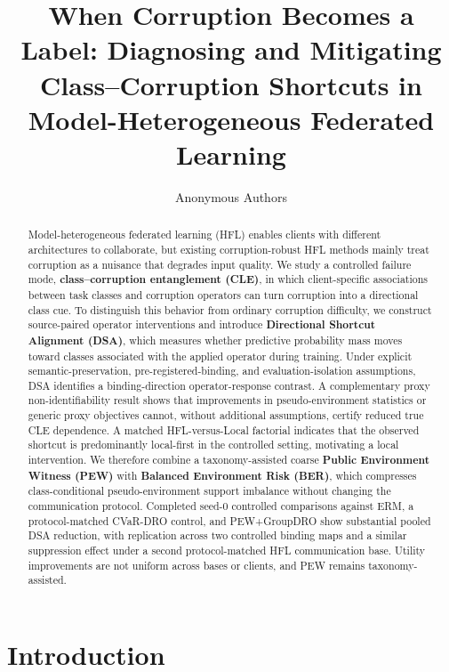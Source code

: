 \documentclass[10pt,twocolumn]{article}
\title{When Corruption Becomes a Label: Diagnosing and Mitigating\\
Class--Corruption Shortcuts in Model-Heterogeneous Federated Learning}
\author{Anonymous Authors}
\date{}
\begin{document}
\maketitle

\begin{abstract}

Model-heterogeneous federated learning (HFL) enables clients with different architectures to collaborate, but existing corruption-robust HFL methods mainly treat corruption as a nuisance that degrades input quality. We study a controlled failure mode, \textbf{class--corruption entanglement (CLE)}, in which client-specific associations between task classes and corruption operators can turn corruption into a directional class cue. To distinguish this behavior from ordinary corruption difficulty, we construct source-paired operator interventions and introduce \textbf{Directional Shortcut Alignment (DSA)}, which measures whether predictive probability mass moves toward classes associated with the applied operator during training. Under explicit semantic-preservation, pre-registered-binding, and evaluation-isolation assumptions, DSA identifies a binding-direction operator-response contrast. A complementary proxy non-identifiability result shows that improvements in pseudo-environment statistics or generic proxy objectives cannot, without additional assumptions, certify reduced true CLE dependence. A matched HFL-versus-Local factorial indicates that the observed shortcut is predominantly local-first in the controlled setting, motivating a local intervention. We therefore combine a taxonomy-assisted coarse \textbf{Public Environment Witness (PEW)} with \textbf{Balanced Environment Risk (BER)}, which compresses class-conditional pseudo-environment support imbalance without changing the communication protocol. Completed seed-0 controlled comparisons against ERM, a protocol-matched CVaR-DRO control, and PEW+GroupDRO show substantial pooled DSA reduction, with replication across two controlled binding maps and a similar suppression effect under a second protocol-matched HFL communication base. Utility improvements are not uniform across bases or clients, and PEW remains taxonomy-assisted.

\end{abstract}

\section{Introduction}
\end{document}
